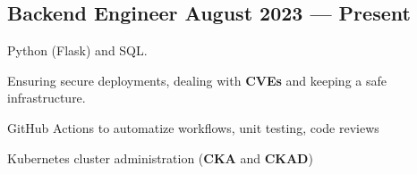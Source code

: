 \documentclass[letter,10pt]{article}
\begin{document}








\subsection{{Backend Engineer \hfill August 2023 --- Present}}

\begin{zitemize}
\item Python (Flask) and SQL.
\item Ensuring secure deployments, dealing with \textbf{CVEs} and keeping a safe infrastructure.
\item GitHub Actions to automatize workflows, unit testing, code reviews
\item Kubernetes cluster administration (\textbf{CKA} and \textbf{CKAD})
\end{zitemize}
\end{document}
